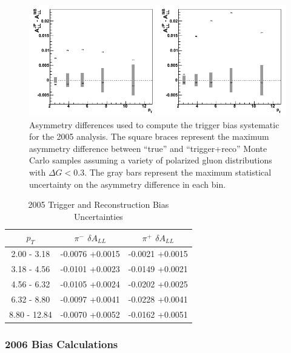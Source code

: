 \begin{figure}
    \includegraphics[width=\textwidth]{figures/syst_mcasym_2005}
    \caption{Asymmetry differences used to compute the trigger bias systematic for the 2005 analysis. The square braces represent the maximum asymmetry difference between ``true'' and ``trigger+reco'' Monte Carlo samples assuming a variety of polarized gluon distributions with $\Delta G < 0.3$.  The gray bars represent the maximum statistical uncertainty on the asymmetry difference in each bin.}
    \label{fig:mcasym-2005}
\end{figure}

\begin{table}[ht]
    \begin{center}
        \begin{tabular}{c|c|c}
        \hline
        $p_{T}$ & $\pi^{-}$ $\delta A_{LL}$ & $\pi^{+}$ $\delta A_{LL}$\\
        \hline
        2.00 - 3.18  & -0.0076 +0.0015 & -0.0021 +0.0015\\
        3.18 - 4.56  & -0.0101 +0.0023 & -0.0149 +0.0021\\
        4.56 - 6.32  & -0.0105 +0.0024 & -0.0202 +0.0025\\
        6.32 - 8.80  & -0.0097 +0.0041 & -0.0228 +0.0041\\
        8.80 - 12.84 & -0.0070 +0.0052 & -0.0162 +0.0051\\
    \hline
    \end{tabular}
    \end{center}
    \caption{2005 Trigger and Reconstruction Bias Uncertainties}
    \label{tbl:trig-reco-bias}
\end{table}

\subsubsection{2006 Bias Calculations}

